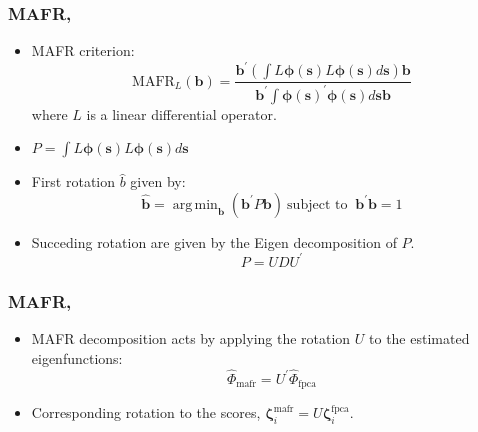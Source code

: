 \documentclass[aspectratio=169]{beamer}
\newcommand{\ve}[1]{\bm{{#1}}}
\DeclareMathOperator*{\argmin}{arg\,min}
\begin{document}
  \begin{frame}
    \frametitle{MAFR, \cite{hooker_maximal_2016}}
      \begin{itemize}
        \item MAFR criterion:
          \begin{equation}
          \text{MAFR}_L(\ve{b}) = \frac{\ve{b}^\prime \left( \int L\ve{\phi}(\ve{s}) L \ve{\phi}(\ve{s}) d\ve{s}\right) \ve{b}}{\ve{b}^\prime \int \ve{\phi}(\ve{s})^\prime \ve{\phi}(\ve{s}) d\ve{s} \ve{b}}
            \label{eqn:mafr}
          \end{equation}
          where $L$ is a linear differential operator. 
        \item $P = \int  L\ve{\phi}(\ve{s}) L \ve{\phi}(\ve{s}) d\ve{s}$
        \item First rotation $\hat{b}$ given by:
          \begin{equation}
            \hat{\ve{b}} = \argmin_{\ve{b}} \left( \ve{b}^\prime P \ve{b} \right)~\text{subject to }~\ve{b}^\prime \ve{b} = 1
            \label{eqn:mafr_rot}
          \end{equation}
        \item Succeding rotation are given by the Eigen decomposition of $P$.
          \begin{equation}
            P = U D U^\prime
            \label{eqn:P}
          \end{equation}
      \end{itemize}
  \end{frame}
  
  \begin{frame}
    \frametitle{MAFR, \cite{hooker_maximal_2016}}
      \begin{itemize}
        \item MAFR decomposition acts by applying the rotation $U$ to the estimated eigenfunctions:
          \begin{equation}
            \hat{\Phi}_\text{mafr} = U^\prime \hat{\Phi}_\text{fpca}
            \label{eqn:mafr}
          \end{equation}
        \item Corresponding rotation to the scores, $\ve{\zeta}_{i}^\text{mafr} = U \ve{\zeta}_{i}^\text{fpca}$.
      \end{itemize}
  \end{frame}
\end{document}
